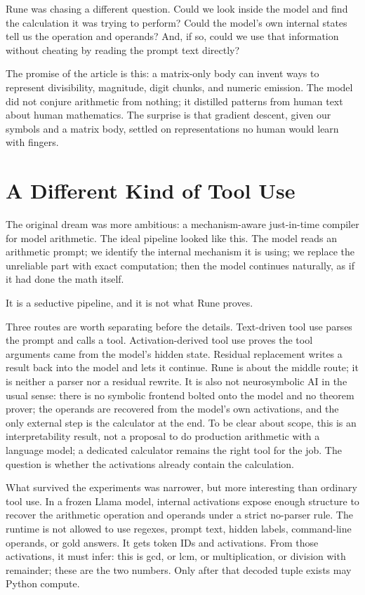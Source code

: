 \documentclass[acmsmall,screen,nonacm]{acmart}
\begin{document}
Rune was chasing a different question. Could we look inside the model and find
the calculation it was trying to perform? Could the model's own internal states
tell us the operation and operands? And, if so, could we use that information
without cheating by reading the prompt text directly?

The promise of the article is this: a matrix-only body can invent ways to
represent divisibility, magnitude, digit chunks, and numeric emission. The model
did not conjure arithmetic from nothing; it distilled patterns from human text
about human mathematics. The surprise is that gradient descent, given our
symbols and a matrix body, settled on representations no human would learn with
fingers.

\section{A Different Kind of Tool Use}

The original dream was more ambitious: a mechanism-aware just-in-time compiler
for model arithmetic. The ideal pipeline looked like this. The model reads an
arithmetic prompt; we identify the internal mechanism it is using; we replace
the unreliable part with exact computation; then the model continues naturally,
as if it had done the math itself.

It is a seductive pipeline, and it is not what Rune proves.

Three routes are worth separating before the details. Text-driven tool use
parses the prompt and calls a tool. Activation-derived tool use proves the tool
arguments came from the model's hidden state. Residual replacement writes a
result back into the model and lets it continue. Rune is about the middle route;
it is neither a parser nor a residual rewrite. It is also not neurosymbolic AI
in the usual sense: there is no symbolic frontend bolted onto the model and no
theorem prover; the operands are recovered from the model's own activations, and
the only external step is the calculator at the end. To be clear about scope,
this is an interpretability result, not a proposal to do production arithmetic
with a language model; a dedicated calculator remains the right tool for the
job. The question is whether the activations already contain the calculation.

What survived the experiments was narrower, but more interesting than ordinary
tool use. In a frozen Llama model, internal activations expose enough structure
to recover the arithmetic operation and operands under a strict no-parser rule.
The runtime is not allowed to use regexes, prompt text, hidden labels,
command-line operands, or gold answers. It gets token IDs and activations. From
those activations, it must infer: this is gcd, or lcm, or multiplication, or
division with remainder; these are the two numbers. Only after that decoded
tuple exists may Python compute.
\end{document}

